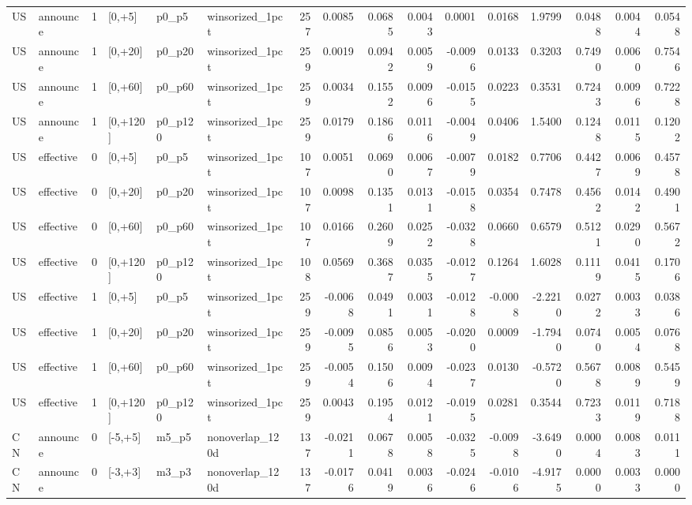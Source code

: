 \begin{tabular}{llrlllrrrrrrrrrr}
US & announce & 1 & [0,+5] & p0_p5 & winsorized_1pct & 257 & 0.0085 & 0.0685 & 0.0043 & 0.0001 & 0.0168 & 1.9799 & 0.0488 & 0.0044 & 0.0548 \\
US & announce & 1 & [0,+20] & p0_p20 & winsorized_1pct & 259 & 0.0019 & 0.0942 & 0.0059 & -0.0096 & 0.0133 & 0.3203 & 0.7490 & 0.0060 & 0.7546 \\
US & announce & 1 & [0,+60] & p0_p60 & winsorized_1pct & 259 & 0.0034 & 0.1552 & 0.0096 & -0.0155 & 0.0223 & 0.3531 & 0.7243 & 0.0096 & 0.7228 \\
US & announce & 1 & [0,+120] & p0_p120 & winsorized_1pct & 259 & 0.0179 & 0.1866 & 0.0116 & -0.0049 & 0.0406 & 1.5400 & 0.1248 & 0.0115 & 0.1202 \\
US & effective & 0 & [0,+5] & p0_p5 & winsorized_1pct & 107 & 0.0051 & 0.0690 & 0.0067 & -0.0079 & 0.0182 & 0.7706 & 0.4427 & 0.0069 & 0.4578 \\
US & effective & 0 & [0,+20] & p0_p20 & winsorized_1pct & 107 & 0.0098 & 0.1351 & 0.0131 & -0.0158 & 0.0354 & 0.7478 & 0.4562 & 0.0142 & 0.4901 \\
US & effective & 0 & [0,+60] & p0_p60 & winsorized_1pct & 107 & 0.0166 & 0.2609 & 0.0252 & -0.0328 & 0.0660 & 0.6579 & 0.5121 & 0.0290 & 0.5672 \\
US & effective & 0 & [0,+120] & p0_p120 & winsorized_1pct & 108 & 0.0569 & 0.3687 & 0.0355 & -0.0127 & 0.1264 & 1.6028 & 0.1119 & 0.0415 & 0.1706 \\
US & effective & 1 & [0,+5] & p0_p5 & winsorized_1pct & 259 & -0.0068 & 0.0491 & 0.0031 & -0.0128 & -0.0008 & -2.2210 & 0.0272 & 0.0033 & 0.0386 \\
US & effective & 1 & [0,+20] & p0_p20 & winsorized_1pct & 259 & -0.0095 & 0.0856 & 0.0053 & -0.0200 & 0.0009 & -1.7940 & 0.0740 & 0.0054 & 0.0768 \\
US & effective & 1 & [0,+60] & p0_p60 & winsorized_1pct & 259 & -0.0054 & 0.1506 & 0.0094 & -0.0237 & 0.0130 & -0.5720 & 0.5678 & 0.0089 & 0.5459 \\
US & effective & 1 & [0,+120] & p0_p120 & winsorized_1pct & 259 & 0.0043 & 0.1954 & 0.0121 & -0.0195 & 0.0281 & 0.3544 & 0.7233 & 0.0119 & 0.7188 \\
CN & announce & 0 & [-5,+5] & m5_p5 & nonoverlap_120d & 137 & -0.0211 & 0.0678 & 0.0058 & -0.0325 & -0.0098 & -3.6490 & 0.0004 & 0.0083 & 0.0111 \\
CN & announce & 0 & [-3,+3] & m3_p3 & nonoverlap_120d & 137 & -0.0176 & 0.0419 & 0.0036 & -0.0246 & -0.0106 & -4.9175 & 0.0000 & 0.0033 & 0.0000 \\

\end{tabular}
